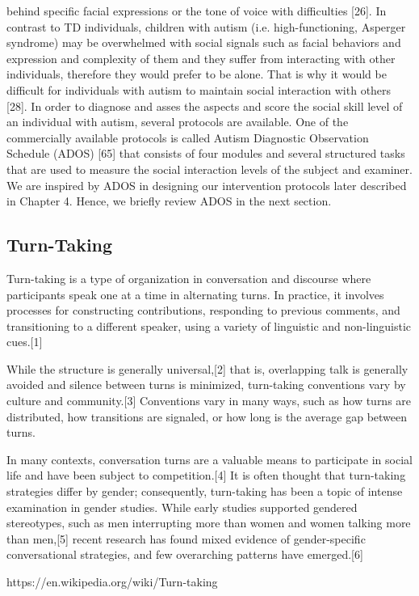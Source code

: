 behind specific facial expressions or the tone of voice with difficulties [26]. In contrast to
TD individuals, children with autism (i.e. high-functioning, Asperger syndrome) may be
overwhelmed with social signals such as facial behaviors and expression and complexity
of them and they suffer from interacting with other individuals, therefore they would prefer
to be alone. That is why it would be difficult for individuals with autism to maintain social
interaction with others [28].
In order to diagnose and asses the aspects and score the social skill level of an individual
with autism, several protocols are available. One of the commercially available protocols
is called Autism Diagnostic Observation Schedule (ADOS) [65] that consists of four
modules and several structured tasks that are used to measure the social interaction levels
of the subject and examiner. We are inspired by ADOS in designing our intervention
protocols later described in Chapter 4. Hence, we briefly review ADOS in the next section.

\subsection{Turn-Taking}
Turn-taking is a type of organization in conversation and discourse where participants speak 
one at a time in alternating turns. In practice, it involves processes for constructing 
contributions, responding to previous comments, and transitioning to a different speaker, 
using a variety of linguistic and non-linguistic cues.[1]

While the structure is generally universal,[2] that is, overlapping talk is generally 
avoided and silence between turns is minimized, turn-taking conventions vary by culture 
and community.[3] Conventions vary in many ways, such as how turns are distributed, how 
transitions are signaled, or how long is the average gap between turns.

In many contexts, conversation turns are a valuable means to participate in social life 
and have been subject to competition.[4] It is often thought that turn-taking strategies 
differ by gender; consequently, turn-taking has been a topic of intense examination in 
gender studies. While early studies supported gendered stereotypes, such as men interrupting
more than women and women talking more than men,[5] recent research has found mixed evidence 
of gender-specific conversational strategies, and few overarching patterns have emerged.[6]

https://en.wikipedia.org/wiki/Turn-taking

